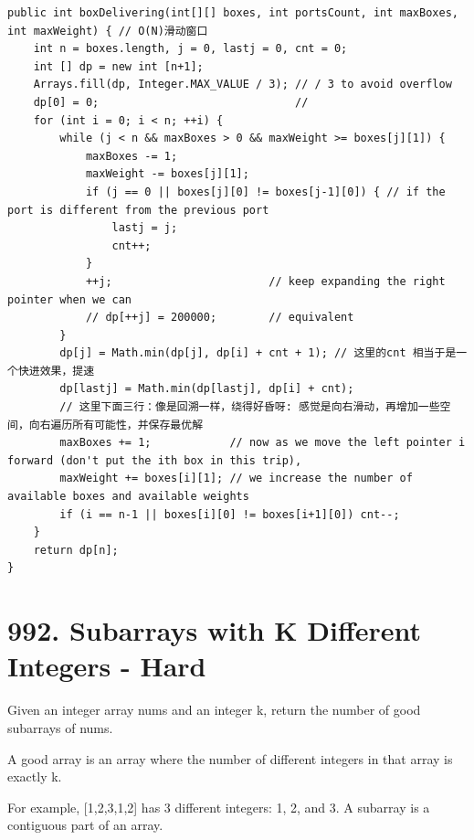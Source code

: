 \documentclass[9pt, b5paaper]{book}
\begin{document}
\begin{verbatim}
public int boxDelivering(int[][] boxes, int portsCount, int maxBoxes, int maxWeight) { // O(N)滑动窗口
    int n = boxes.length, j = 0, lastj = 0, cnt = 0;
    int [] dp = new int [n+1];
    Arrays.fill(dp, Integer.MAX_VALUE / 3); // / 3 to avoid overflow
    dp[0] = 0;                              //
    for (int i = 0; i < n; ++i) {
        while (j < n && maxBoxes > 0 && maxWeight >= boxes[j][1]) {
            maxBoxes -= 1;
            maxWeight -= boxes[j][1];
            if (j == 0 || boxes[j][0] != boxes[j-1][0]) { // if the port is different from the previous port
                lastj = j;
                cnt++;
            }
            ++j;                        // keep expanding the right pointer when we can
            // dp[++j] = 200000;        // equivalent
        }
        dp[j] = Math.min(dp[j], dp[i] + cnt + 1); // 这里的cnt 相当于是一个快进效果，提速
        dp[lastj] = Math.min(dp[lastj], dp[i] + cnt);
        // 这里下面三行：像是回溯一样，绕得好昏呀: 感觉是向右滑动，再增加一些空间，向右遍历所有可能性，并保存最优解
        maxBoxes += 1;            // now as we move the left pointer i forward (don't put the ith box in this trip), 
        maxWeight += boxes[i][1]; // we increase the number of available boxes and available weights
        if (i == n-1 || boxes[i][0] != boxes[i+1][0]) cnt--;
    }
    return dp[n];
}
\end{verbatim}
\section{992. Subarrays with K Different Integers - Hard}
\label{sec-12-8}
Given an integer array nums and an integer k, return the number of good subarrays of nums.

A good array is an array where the number of different integers in that array is exactly k.

For example, [1,2,3,1,2] has 3 different integers: 1, 2, and 3.
A subarray is a contiguous part of an array.
\end{document}
